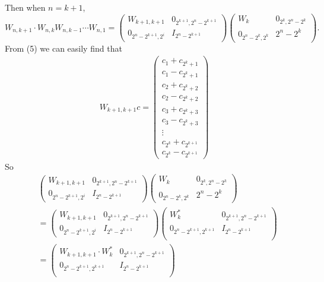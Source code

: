 \documentclass[12pt]{article}
\begin{document}
Then when $n = k + 1$,
\[
W_{n, k+1} \cdot W_{n, k} W_{n, k - 1}\cdots W_{n, 1} =
\begin{pmatrix}
W_{k+1, k+1} & 0_{2^{k+1}, 2^{n} - 2^{k+1}} \\
0_{2^{n}- 2^{k+1}, 2^i} & I_{2^{n} - 2^{k+1}}
\end{pmatrix}
\begin{pmatrix}
 W_{k} & 0_{2^{k}, 2^{n} - 2^{k}} \\
0_{2^{n}- 2^{k}, 2^k} & {2^{n} - 2^{k}}
\end{pmatrix}.
\]
From (5) we can easily find that 
\begin{align*}
W_{k+1,k+1}c =
\begin{pmatrix}
c_1 + c_{2^{k} + 1} \\
c_1 - c_{2^{k} + 1} \\
c_2 + c_{2^{k} + 2} \\
c_2 - c_{2^{k} + 2} \\
c_3 + c_{2^{k} + 3} \\
c_3 - c_{2^{k} + 3} \\
 \vdots \\
c_{2^{k}} + c_{2^{k+1}} \\
c_{2^{k}} - c_{2^{k+1}}
\end{pmatrix}
\end{align*}
So 
\begin{align*}
&\begin{pmatrix}
W_{k+1, k+1} & 0_{2^{k+1}, 2^{n} - 2^{k+1}} \\
0_{2^{n}- 2^{k+1}, 2^i} & I_{2^{n} - 2^{k+1}}
\end{pmatrix}
\begin{pmatrix}
 W_{k} & 0_{2^{k}, 2^{n} - 2^{k}} \\
0_{2^{n}- 2^{k}, 2^k} & {2^{n} - 2^{k}}
\end{pmatrix} \\
&= 
\begin{pmatrix}
W_{k+1, k+1} & 0_{2^{k+1}, 2^{n} - 2^{k+1}} \\
0_{2^{n}- 2^{k+1}, 2^i} & I_{2^{n} - 2^{k+1}}
\end{pmatrix}
\begin{pmatrix}
 W_{k}^* & 0_{2^{k+1}, 2^{n} - 2^{k+1}} \\
0_{2^{n}- 2^{k+1}, 2^{k+1}} & I_{2^{n} - 2^{k+1}} \\
\end{pmatrix} \\
&=
\begin{pmatrix}
 W_{k+1, k+1} \cdot W_{k}^* & 0_{2^{k+1}, 2^{n} - 2^{k+1}} \\
0_{2^{n}- 2^{k+1}, 2^{k+1}} & I_{2^{n} - 2^{k+1}} \\
\end{pmatrix}
\end{align*}
\end{document}
